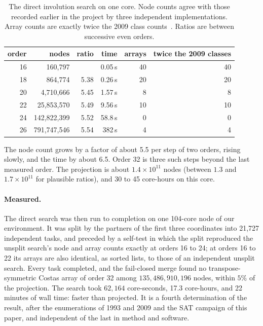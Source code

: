 \documentclass[11pt,a4paper,oneside]{report}
\theoremstyle{definition}
\begin{document}
\begin{table}[H]
\centering
\begin{tabular}{@{}rrrrrr@{}}
\toprule
order & nodes & ratio & time & arrays & twice the 2009 classes \\
\midrule
16 & 160{,}797 & & 0.05\,s & 40 & 40 \\
18 & 864{,}774 & 5.38 & 0.26\,s & 20 & 20 \\
20 & 4{,}710{,}666 & 5.45 & 1.57\,s & 8 & 8 \\
22 & 25{,}853{,}570 & 5.49 & 9.56\,s & 10 & 10 \\
24 & 142{,}822{,}399 & 5.52 & 58.8\,s & 0 & 0 \\
26 & 791{,}747{,}546 & 5.54 & 382\,s & 4 & 4 \\
\bottomrule
\end{tabular}
\caption{The direct involution search on one core. Node counts agree with those recorded earlier in
the project by three independent implementations. Array counts are exactly twice the 2009 class
counts~\cite{p8-taylor2009}. Ratios are between successive even orders.}
\label{p8-tab:direct}
\end{table}

The node count grows by a factor of about 5.5 per step of two orders, rising slowly, and the time by
about 6.5. Order 32 is three such steps beyond the last measured order. The projection is
about $1.4\times10^{11}$ nodes (between $1.3$ and $1.7\times10^{11}$ for plausible ratios), and 30 to 45
core-hours on this core.

\paragraph{Measured.} The direct search was then run to completion on one 104-core node of our
environment. It was split by the partners of the first three coordinates into 21{,}727 independent tasks,
and preceded by a self-test in which the split reproduced the unsplit search's node and array counts
exactly at orders 16 to 24; at orders 16 to 22 its arrays are also identical, as sorted lists, to those of an
independent unsplit search. Every task completed, and the fail-closed merge found no transpose-symmetric
Costas array of order 32 among $135{,}486{,}910{,}196$ nodes, within $5\%$ of the projection. The search took
$62{,}164$ core-seconds, 17.3 core-hours, and 22 minutes of wall time: faster than projected. It is a
fourth determination of the result, after the enumerations of 1993 and 2009 and the SAT campaign of this
paper, and independent of the last in method and software.
\end{document}
